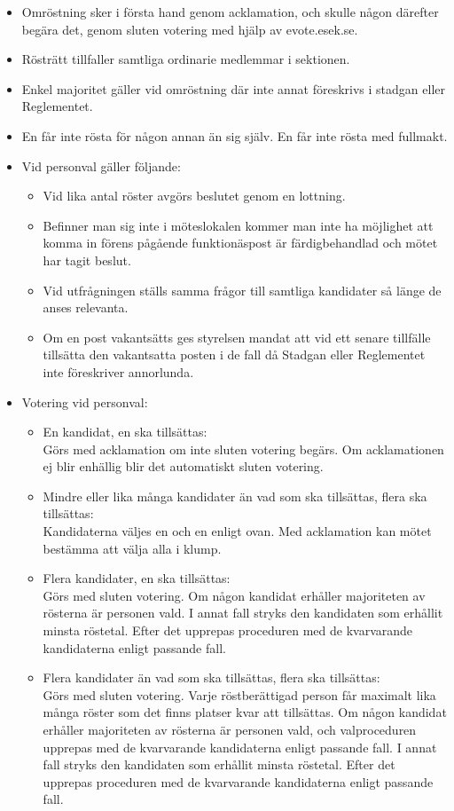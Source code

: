 \documentclass[12pt]{article}
\begin{document}
    \begin{itemize}
    \item Omröstning sker i första hand genom acklamation, och skulle någon därefter begära det, genom sluten votering med hjälp av evote.esek.se.   
    \item Rösträtt tillfaller samtliga ordinarie medlemmar i sektionen.
    \item Enkel majoritet gäller vid omröstning där inte annat föreskrivs i stadgan eller Reglementet. 
    \item En får inte rösta för någon annan än sig själv. En får inte rösta med fullmakt.
    \item Vid personval gäller följande:
        
        \begin{itemize}
        \item Vid lika antal röster avgörs beslutet genom en lottning.
        \item Befinner man sig inte i möteslokalen kommer man inte ha möjlighet att komma in förens pågående funktionäspost är färdigbehandlad och mötet har tagit beslut.  
        \item Vid utfrågningen ställs samma frågor till samtliga kandidater så länge de anses relevanta.
        \item Om en post vakantsätts ges styrelsen mandat att vid ett senare tillfälle tillsätta den vakantsatta posten i de fall då Stadgan eller Reglementet inte föreskriver annorlunda.  
         \end{itemize}
    \item Votering vid personval:
    \begin{itemize}
        \item En kandidat, en ska tillsättas: 
        \\ Görs med acklamation om inte sluten votering begärs. Om acklamationen ej blir enhällig blir det automatiskt sluten votering.
        \item Mindre eller lika många kandidater än vad som ska tillsättas, flera ska tillsättas: 
        \\ Kandidaterna väljes en och en enligt ovan. Med acklamation kan mötet bestämma att välja alla i klump.
        \item Flera kandidater, en ska tillsättas:
        \\ Görs med sluten votering. Om någon kandidat erhåller majoriteten av rösterna är personen vald. I annat fall stryks den kandidaten som erhållit minsta röstetal. Efter det upprepas proceduren med de kvarvarande kandidaterna enligt passande fall.
        \item Flera kandidater än vad som ska tillsättas, flera ska tillsättas:
        \\ Görs med sluten votering. Varje röstberättigad person får maximalt lika många röster som det finns platser kvar att tillsättas. Om någon kandidat erhåller majoriteten av rösterna är personen vald, och valproceduren upprepas med de kvarvarande kandidaterna enligt passande fall. I annat fall stryks den kandidaten som erhållit minsta röstetal. Efter det upprepas proceduren med de kvarvarande kandidaterna enligt passande fall.
       \end{itemize}


\end{itemize}
\end{document}
